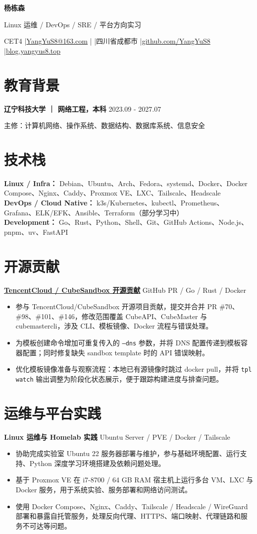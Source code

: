 \documentclass[10pt,a4paper,fontset=none]{ctexart}
\newcommand{\resumeSection}[1]{%
  \section*{#1}%
  \vspace{-0.35em}{\color{rulegray}\hrule height 0.5pt}\vspace{0.2em}%
}
\newcommand{\resumeSubheading}[2]{%
  \textbf{#1} \hfill {\small #2}\par
}
\newcommand{\resumeItemListStart}{\begin{itemize}}
\newcommand{\resumeItemListEnd}{\end{itemize}}
\newcommand{\resumeItem}[1]{\item {\small #1}}
\begin{document}
{\centering
  {\fontsize{18}{20}\selectfont\bfseries 杨栋森\par}
  \vspace{0.15em}
  {\normalsize Linux 运维 / DevOps / SRE / 平台方向实习\par}
  \vspace{0.2em}
  {\small CET4 \enspace|\enspace \href{mailto:YangYuS8@163.com}{YangYuS8@163.com} \enspace| \enspace|\enspace 四川省成都市 \enspace|\enspace \href{https://github.com/YangYuS8}{github.com/YangYuS8} \enspace|\enspace \href{https://blog.yangyus8.top}{blog.yangyus8.top}\par}
}

\resumeSection{教育背景}
\resumeSubheading{辽宁科技大学 ｜ 网络工程，本科}{2023.09 - 2027.07}
{\small 主修：计算机网络、操作系统、数据结构、数据库系统、信息安全}

\resumeSection{技术栈}
{\small
\textbf{Linux / Infra：} Debian、Ubuntu、Arch、Fedora、systemd、Docker、Docker Compose、Nginx、Caddy、Proxmox VE、LXC、Tailscale、Headscale \\
\textbf{DevOps / Cloud Native：} k3s/Kubernetes、kubectl、Prometheus、Grafana、ELK/EFK、Ansible、Terraform（部分学习中） \\
\textbf{Development：} Go、Rust、Python、Shell、Git、GitHub Actions、Node.js、pnpm、uv、FastAPI
}

\resumeSection{开源贡献}
\resumeSubheading{\href{https://github.com/TencentCloud/CubeSandbox}{TencentCloud / CubeSandbox 开源贡献}}{GitHub PR / Go / Rust / Docker}
\resumeItemListStart
  \resumeItem{参与 TencentCloud/CubeSandbox 开源项目贡献，提交并合并 PR \#70、\#98、\#101、\#146，修改范围覆盖 CubeAPI、CubeMaster 与 cubemastercli，涉及 CLI、模板镜像、Docker 流程与错误处理。}
  \resumeItem{为模板创建命令增加可重复传入的 \texttt{--dns} 参数，并将 DNS 配置传递到模板容器配置；同时修复缺失 sandbox template 时的 API 错误映射。}
  \resumeItem{优化模板镜像准备与观察流程：本地已有源镜像时跳过 docker pull，并将 \texttt{tpl watch} 输出调整为阶段化状态展示，便于跟踪构建进度与排查问题。}
\resumeItemListEnd

\resumeSection{运维与平台实践}
\resumeSubheading{Linux 运维与 Homelab 实践}{Ubuntu Server / PVE / Docker / Tailscale}
\resumeItemListStart
  \resumeItem{协助完成实验室 Ubuntu 22 服务器部署与维护，参与基础环境配置、运行支持、Python 深度学习环境搭建及依赖问题处理。}
  \resumeItem{基于 Proxmox VE 在 i7-8700 / 64 GB RAM 宿主机上运行多台 VM、LXC 与 Docker 服务，用于系统实验、服务部署和网络访问测试。}
  \resumeItem{使用 Docker Compose、Nginx、Caddy、Tailscale / Headscale / WireGuard 部署和暴露自托管服务，处理反向代理、HTTPS、端口映射、代理链路和服务不可达等问题。}
\resumeItemListEnd
\end{document}
